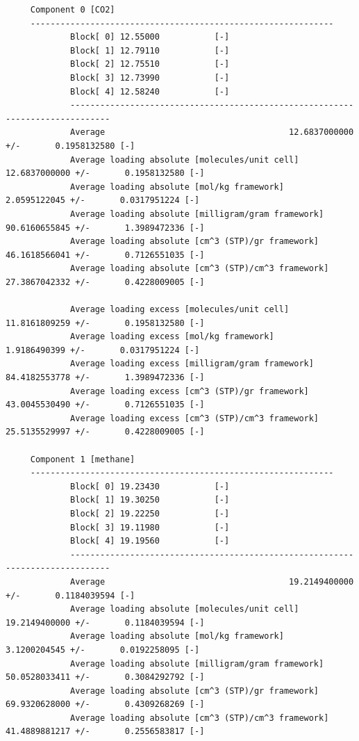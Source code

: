 \begin{tiny}
\begin{verbatim}
     Component 0 [CO2]
     -------------------------------------------------------------
             Block[ 0] 12.55000           [-]
             Block[ 1] 12.79110           [-]
             Block[ 2] 12.75510           [-]
             Block[ 3] 12.73990           [-]
             Block[ 4] 12.58240           [-]
             ------------------------------------------------------------------------------
             Average                                     12.6837000000 +/-       0.1958132580 [-]
             Average loading absolute [molecules/unit cell]       12.6837000000 +/-       0.1958132580 [-]
             Average loading absolute [mol/kg framework]          2.0595122045 +/-       0.0317951224 [-]
             Average loading absolute [milligram/gram framework]         90.6160655845 +/-       1.3989472336 [-]
             Average loading absolute [cm^3 (STP)/gr framework]         46.1618566041 +/-       0.7126551035 [-]
             Average loading absolute [cm^3 (STP)/cm^3 framework]         27.3867042332 +/-       0.4228009005 [-]
     
             Average loading excess [molecules/unit cell]       11.8161809259 +/-       0.1958132580 [-]
             Average loading excess [mol/kg framework]          1.9186490399 +/-       0.0317951224 [-]
             Average loading excess [milligram/gram framework]         84.4182553778 +/-       1.3989472336 [-]
             Average loading excess [cm^3 (STP)/gr framework]         43.0045530490 +/-       0.7126551035 [-]
             Average loading excess [cm^3 (STP)/cm^3 framework]         25.5135529997 +/-       0.4228009005 [-]
     
     Component 1 [methane]
     -------------------------------------------------------------
             Block[ 0] 19.23430           [-]
             Block[ 1] 19.30250           [-]
             Block[ 2] 19.22250           [-]
             Block[ 3] 19.11980           [-]
             Block[ 4] 19.19560           [-]
             ------------------------------------------------------------------------------
             Average                                     19.2149400000 +/-       0.1184039594 [-]
             Average loading absolute [molecules/unit cell]       19.2149400000 +/-       0.1184039594 [-]
             Average loading absolute [mol/kg framework]          3.1200204545 +/-       0.0192258095 [-]
             Average loading absolute [milligram/gram framework]         50.0528033411 +/-       0.3084292792 [-]
             Average loading absolute [cm^3 (STP)/gr framework]         69.9320628000 +/-       0.4309268269 [-]
             Average loading absolute [cm^3 (STP)/cm^3 framework]         41.4889881217 +/-       0.2556583817 [-]
     

\end{verbatim}
\end{tiny}
